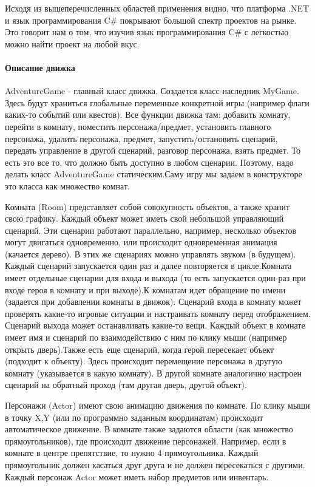 Исходя из вышеперечисленных областей применения видно, что платформа .NET и язык программирования C\# покрывают большой спектр проектов на рынке. Это говорит нам о том, что изучив язык программирования C\# с легкостью можно найти проект на любой вкус.

\paragraph{Описание движка}
AdventureGame - главный класс движка. Создается класс-наследник MyGame. Здесь будут храниться глобальные переменные конкретной игры (например флаги каких-то событий или квестов). Все функции движка там: добавить комнату, перейти в комнату, поместить персонажа/предмет, установить главного персонажа, удалить персонажа, предмет, запустить/остановить сценарий, передать управление в другой сценарий, разговор персонажа, взять предмет.
То есть это все то, что должно быть доступно в любом сценарии. Поэтому, надо делать класс AdventureGame статическим.Саму игру мы задаем в конструкторе это класса как множество комнат. 

Комната (Room) представляет собой совокупность объектов, а также хранит свою графику. Каждый объект может иметь свой небольшой управляющий сценарий. Эти сценарии работают параллельно, например, несколько объектов могут двигаться одновременно, или происходит одновременная анимация (качается дерево). В этих же сценариях можно управлять звуком (в будущем). Каждый сценарий запускается один раз и далее повторяется в цикле.Комната имеет отдельные сценарии для входа и выхода (то есть запускается один раз при входе героя в комнату и при выходе).К комнатам идет обращение по имени (задается при добавлении комнаты в движок).
Сценарий входа в комнату может проверять какие-то игровые ситуации и настраивать комнату перед отображением. Сценарий выхода может останавливать какие-то вещи.
Каждый объект в комнате имеет имя и сценарий по взаимодействию с ним по клику мыши (например открыть дверь).Также есть еще сценарий, когда герой пересекает объект (подходит к объекту). Здесь происходит перемещение персонажа в другую комнату (указывается в какую комнату). В другой комнате аналогично настроен сценарий на обратный проход (там другая дверь, другой объект).

Персонажи (Actor) имеют свою анимацию движения по комнате. По клику мыши в точку X,Y (или по программно заданным координатам) происходит автоматическое движение.
В комнате также задаются области (как множество прямоугольников), где происходит движение персонажей. Например, если в комнате в центре препятствие, то нужно 4 прямоугольника. Каждый прямоугольник должен касаться друг друга и не должен пересекаться с другими.
Каждый персонаж Actor может иметь набор предметов или инвентарь.

